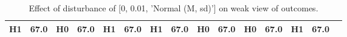 \begin{table}
\begin{tabular}{l|cc|cc|cc|cc|cc|cc|cc}
\cellcolor{Bittersweet}H1&\cellcolor{Bittersweet}67.0&\cellcolor{Bittersweet}H0&\cellcolor{Bittersweet}67.0&\cellcolor{Bittersweet}H1&\cellcolor{Bittersweet}67.0&\cellcolor{Bittersweet}H1&\cellcolor{Bittersweet}67.0&\cellcolor{Bittersweet}H0&\cellcolor{Bittersweet}67.0&\cellcolor{Bittersweet}H0&\cellcolor{Bittersweet}67.0&\cellcolor{Bittersweet}H1&\cellcolor{Bittersweet}67.0\\\bottomrule\end{tabular}\caption{Effect of disturbance of [0, 0.01, 'Normal (M, sd)'] on weak view of outcomes.}\end{table}